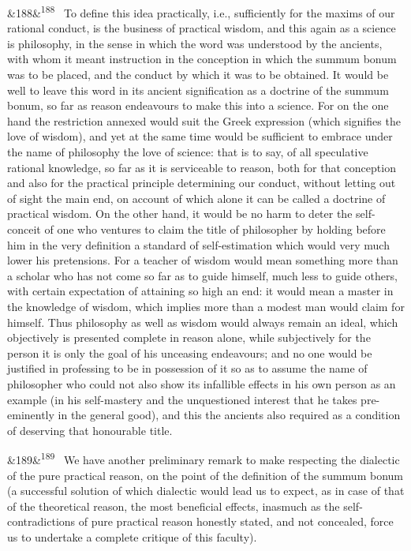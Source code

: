 \documentclass[12pt]{article}
\newcommand{\para}[1][]{\par\noindent\ifx&#1&\else\textsuperscript{\footnotesize #1}~\fi}
\begin{document}
\para[188] To define this idea practically, i.e., sufficiently for the maxims of our rational conduct, is the business of practical wisdom, and this again as a science is philosophy, in the sense in which the word was understood by the ancients, with whom it meant instruction in the conception in which the summum bonum was to be placed, and the conduct by which it was to be obtained. It would be well to leave this word in its ancient signification as a doctrine of the summum bonum, so far as reason endeavours to make this into a science. For on the one hand the restriction annexed would suit the Greek expression (which signifies the love of wisdom), and yet at the same time would be sufficient to embrace under the name of philosophy the love of science: that is to say, of all speculative rational knowledge, so far as it is serviceable to reason, both for that conception and also for the practical principle determining our conduct, without letting out of sight the main end, on account of which alone it can be called a doctrine of practical wisdom. On the other hand, it would be no harm to deter the self-conceit of one who ventures to claim the title of philosopher by holding before him in the very definition a standard of self-estimation which would very much lower his pretensions. For a teacher of wisdom would mean something more than a scholar who has not come so far as to guide himself, much less to guide others, with certain expectation of attaining so high an end: it would mean a master in the knowledge of wisdom, which implies more than a modest man would claim for himself. Thus philosophy as well as wisdom would always remain an ideal, which objectively is presented complete in reason alone, while subjectively for the person it is only the goal of his unceasing endeavours; and no one would be justified in professing to be in possession of it so as to assume the name of philosopher who could not also show its infallible effects in his own person as an example (in his self-mastery and the unquestioned interest that he takes pre-eminently in the general good), and this the ancients also required as a condition of deserving that honourable title.

\para[189] We have another preliminary remark to make respecting the dialectic of the pure practical reason, on the point of the definition of the summum bonum (a successful solution of which dialectic would lead us to expect, as in case of that of the theoretical reason, the most beneficial effects, inasmuch as the self-contradictions of pure practical reason honestly stated, and not concealed, force us to undertake a complete critique of this faculty).
\end{document}
